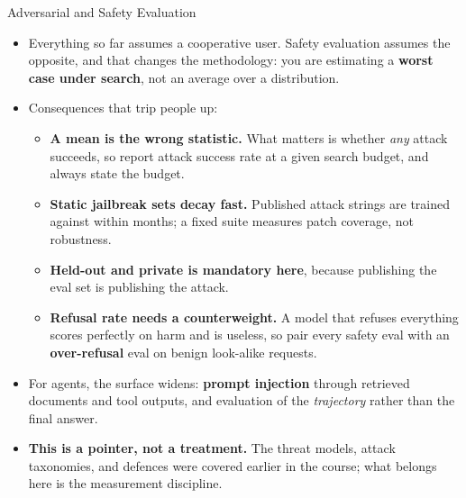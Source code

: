 \begin{frame}[allowframebreaks]{Adversarial and Safety Evaluation}
  \begin{itemize}\itemsep0.35em
    \item[\textcolor{red}{$\blacktriangleright$}] Everything so far assumes a cooperative user. Safety evaluation assumes the opposite, and that changes the methodology: you are estimating a \textbf{worst case under search}, not an average over a distribution.
    \item[\textcolor{red}{$\blacktriangleright$}] Consequences that trip people up:
      \begin{itemize}\footnotesize\itemsep0.15em
        \item \textbf{A mean is the wrong statistic.} What matters is whether \textit{any} attack succeeds, so report attack success rate at a given search budget, and always state the budget.
        \item \textbf{Static jailbreak sets decay fast.} Published attack strings are trained against within months; a fixed suite measures patch coverage, not robustness.
        \item \textbf{Held-out and private is mandatory here}, because publishing the eval set is publishing the attack.
        \item \textbf{Refusal rate needs a counterweight.} A model that refuses everything scores perfectly on harm and is useless, so pair every safety eval with an \textbf{over-refusal} eval on benign look-alike requests.
      \end{itemize}
    \item[\textcolor{red}{$\blacktriangleright$}] For agents, the surface widens: \textbf{prompt injection} through retrieved documents and tool outputs, and evaluation of the \textit{trajectory} rather than the final answer.
    \item[\textcolor{red}{$\blacktriangleright$}] \textbf{This is a pointer, not a treatment.} The threat models, attack taxonomies, and defences were covered earlier in the course; what belongs here is the measurement discipline.
  \end{itemize}
\end{frame}
